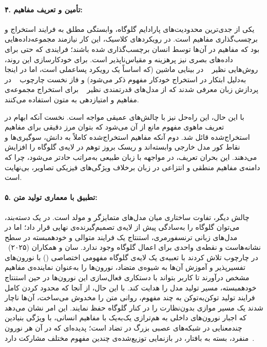 \paragraph{۴. تأمین و تعریف مفاهیم:} یکی از جدی‌ترین محدودیت‌های پارادایم گلوگاه، وابستگی مطلق به فرایند استخراج و برچسب‌گذاری مفاهیم است. در رویکردهای کلاسیک، این کار نیازمند مجموعه‌داده‌هایی بود که مفاهیم در آن‌ها توسط انسان برچسب‌گذاری شده باشند؛ فرایندی که حتی برای داده‌های بصری نیز پرهزینه و مقیاس‌ناپذیر است. برای خودکارسازی این روند، روش‌هایی نظیر ~\cite{oikarinen2023labelfree} در بینایی ماشین (که اساساً یک رویکرد پساعملی است، اما در اینجا به‌دلیل ابتکار در استخراج خودکار مفهوم ذکر می‌شود) و فاز نخست چارچوب ~\cite{sun2025concept} در پردازش زبان معرفی شدند که از مدل‌های قدرتمندی نظیر ~\cite{brown2020language} برای استخراج مجموعه‌ی مفاهیم و امتیازدهی به متون استفاده می‌کنند.

با این حال، این راه‌حل نیز با چالش‌های عمیقی مواجه است. نخست آنکه ابهام در تعریف ماهوی مفهوم مانع از آن می‌شود که بتوان مرز دقیقی برای مفاهیم استخراج‌شده قائل شد. دوم آنکه مفاهیم استخراج‌شده کاملاً به دانش، سوگیری‌ها و نقاط کور مدل خارجی وابسته‌اند و ریسک بروز توهم در لایه‌ی گلوگاه را افزایش می‌دهند. این بحران تعریف، در مواجهه با زبان طبیعی به‌مراتب حادتر می‌شود، چرا که دامنه‌ی مفاهیم منطقی و انتزاعی در زبان برخلاف ویژگی‌های فیزیکی تصاویر، بی‌نهایت است.

\paragraph{۵. تطبیق با معماری تولید متن:} چالش دیگر، تفاوت ساختاری میان مدل‌های متمایزگر و مولد است. در یک دسته‌بند، می‌توان گلوگاه را به‌سادگی پیش از لایه‌ی تصمیم‌گیرنده‌ی نهایی قرار داد؛ اما در مدل‌های زبانی ترنسفورمری، استنتاج یک فرایند متوالی و خودهمبسته در سطح نشانه‌هاست و نقطه‌ی واحدی برای اعمال گلوگاه وجود ندارد. سان و همکاران (۲۰۲۵)~\cite{sun2025concept} در چارچوب  تلاش کردند با تعبیه‌ی یک لایه‌ی گلوگاه مفهومی اختصاصی () با نورون‌های تفسیرپذیر و آموزش آن‌ها به شیوه‌ی متضاد، نورون‌ها را به‌عنوان نماینده‌ی مفاهیم مشخص درآورند تا کاربر بتواند با دستکاری فعال‌سازی این نورون‌ها در حین استنتاج خودهمبسته، مسیر تولید مدل را هدایت کند. با این حال، از آنجا که محدود کردن کامل فرایند تولید توکن‌به‌توکن به چند مفهوم، روانی متن را مخدوش می‌ساخت، آن‌ها ناچار شدند یک مسیر موازی بدون‌نظارت را در کنار گلوگاه حفظ نمایند. این امر نشان می‌دهد که اجبار نورون‌های داخلی به هم‌ترازی یک‌به‌یک با مفاهیم انسانی، با ویژگی بنیادین چندمعنایی در شبکه‌های عصبی بزرگ در تضاد است؛ پدیده‌ای که در آن هر نورون منفرد، بسته به بافتار، در بازنمایی توزیع‌شده‌ی چندین مفهوم مختلف مشارکت دارد~\cite{elhage2022toymodels}.

